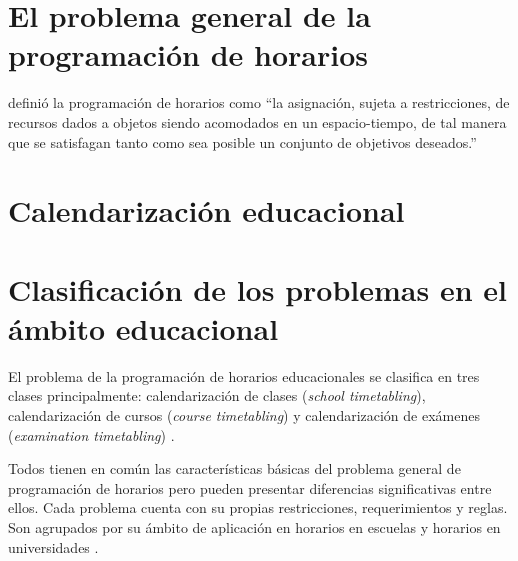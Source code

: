 \documentclass[draft,12pt,headsepline,footsepline,paper=letter]{scrreprt}
\begin{document}
\section{El problema general de la programación de horarios}
\label{problema_general_programacion_horarios}

\citet[p.~53]{wren95scheduling-timetabling} definió la programación de horarios como “la asignación, sujeta a restricciones, de recursos dados a objetos siendo acomodados en un espacio-tiempo, de tal manera que se satisfagan tanto como sea posible un conjunto de objetivos deseados.”

\section{Calendarización educacional} %
\label{calendarizacion_educacional}


\section{Clasificación de los problemas en el ámbito educacional}
\label{clasificacion_problemas}

El problema de la programación de horarios educacionales se clasifica en tres clases principalmente:
calendarización de clases (\textit{school timetabling}),
calendarización de cursos (\textit{course timetabling}) y
calendarización de exámenes (\textit{examination timetabling}) \citep[p.~88]{schaerf99a-survey-of-automated}.

Todos tienen en común las características básicas del problema general de programación de horarios pero pueden presentar diferencias significativas entre ellos. Cada problema cuenta con su propias restricciones, requerimientos y reglas. Son agrupados por su ámbito de aplicación en horarios en escuelas y horarios en universidades \citep[p.~10]{abdullah06heuristic-approaches}.
\end{document}
